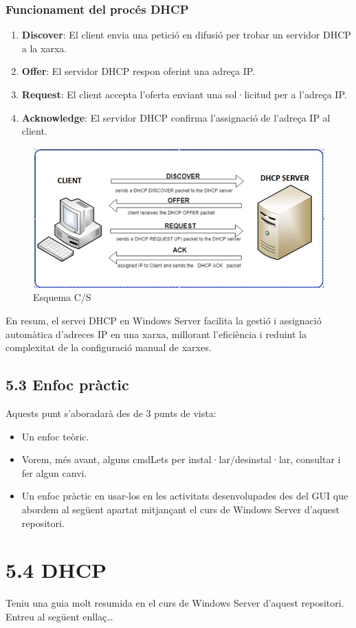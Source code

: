 \documentclass[
  a4paper,
]{article}
\providecommand{\tightlist}{%
  \setlength{\itemsep}{0pt}\setlength{\parskip}{0pt}}
\begin{document}
\subsubsection{Funcionament del procés
DHCP}\label{funcionament-del-procuxe9s-dhcp}

\begin{enumerate}
\def\labelenumi{\arabic{enumi}.}
\tightlist
\item
  \textbf{Discover}: El client envia una petició en difusió per trobar
  un servidor DHCP a la xarxa.
\item
  \textbf{Offer}: El servidor DHCP respon oferint una adreça IP.
\item
  \textbf{Request}: El client accepta l'oferta enviant una sol·licitud
  per a l'adreça IP.
\item
  \textbf{Acknowledge}: El servidor DHCP confirma l'assignació de
  l'adreça IP al client.
\end{enumerate}

\begin{figure}
\centering
\includegraphics{png/DHCPesquema.jpg}
\caption{Esquema C/S}
\end{figure}

En resum, el servei DHCP en Windows Server facilita la gestió i
assignació automàtica d'adreces IP en una xarxa, millorant l'eficiència
i reduint la complexitat de la configuració manual de xarxes.

\subsection{5.3 Enfoc pràctic}\label{enfoc-pruxe0ctic}

Aquests punt s'aboradarà des de 3 punts de vista:

\begin{itemize}
\tightlist
\item
  Un enfoc teòric.
\item
  Vorem, més avant, alguns cmdLets per instal·lar/desinstal·lar,
  consultar i fer algun canvi.
\item
  Un enfoc pràctic en usar-los en les activitats desenvolupades des del
  GUI que abordem al següent apartat mitjançant el curs de Windows
  Server d'aquest repositori.
\end{itemize}

\section{5.4 DHCP}\label{dhcp}

Teniu una guia molt resumida en el curs de Windows Server d'aquest
repositori. Entreu al següent enllaç\ldots{}

\href{https://github.com/tofermos/Windows-Server/blob/main/md/DHCP.md}{}
\end{document}
